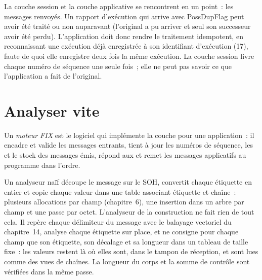 La couche session et la couche applicative se rencontrent en un point~: les messages renvoyés. Un rapport d'exécution qui arrive avec PossDupFlag
peut avoir été traité ou non auparavant (l'original a pu arriver et seul son successeur avoir été perdu). L'application doit donc rendre le traitement idempotent,
en reconnaissant une exécution déjà enregistrée à son identifiant d'exécution (17), faute de quoi elle enregistre deux fois la même exécution.
La couche session livre chaque numéro de séquence une seule fois~; elle ne peut pas savoir ce que l'application
a fait de l'original.

\section{Analyser vite}

\begin{definition}\label{def:ll:protocols-i-fix:engine}
Un \emph{moteur FIX} est le logiciel qui implémente la couche  pour une application~: il encadre et valide les messages entrants,
tient à jour les numéros de séquence, les  et le stock des messages émis, répond aux 
et remet les messages applicatifs au programme dans l'ordre.
\end{definition}

Un analyseur naïf découpe le message sur le SOH, convertit chaque étiquette en entier et copie chaque valeur dans une table associant étiquette et chaîne~: plusieurs allocations
par champ (chapitre~6), une insertion dans un arbre par champ et une passe par octet. L'analyseur de la construction ne fait rien de tout cela. Il repère chaque délimiteur du message
avec le balayage vectoriel du chapitre~14, analyse chaque étiquette sur place, et ne consigne pour chaque champ que son étiquette, son décalage et sa longueur dans un tableau de taille fixe~:
les valeurs restent là où elles sont, dans le tampon de réception, et sont lues comme des vues de chaînes.
La longueur du corps et la somme de contrôle sont vérifiées dans la même passe.

\label{lst:ll:protocols-i-fix:parse}

